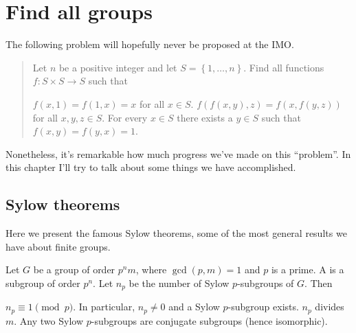 \chapter{Find all groups}
\label{ch:sylow}
The following problem will hopefully never be proposed at the IMO.
\begin{quote}
	Let $n$ be a positive integer and let $S = \left\{ 1,\dots,n \right\}$.
	Find all functions $f \colon S \times S \to S$ such that
	\begin{enumerate}[(a)]
		\ii $f(x,1)=f(1,x)=x$ for all $x \in S$.
		\ii $f(f(x,y),z)=f(x,f(y,z))$ for all $x,y,z \in S$.
		\ii For every $x \in S$ there exists a $y \in S$ such that $f(x,y)=f(y,x)=1$.
	\end{enumerate}
\end{quote}
Nonetheless, it's remarkable how much progress we've made on this ``problem''.
In this chapter I'll try to talk about some things we have accomplished.

\section{Sylow theorems}
Here we present the famous Sylow theorems, some of the most
general results we have about finite groups.

\begin{theorem}
	Let $G$ be a group of order $p^n m$,
	where $\gcd(p,m)=1$ and $p$ is a prime.
	A  is a subgroup of order $p^n$.
	Let $n_p$ be the number of Sylow $p$-subgroups of $G$.
	Then
	\begin{enumerate}[(a)]
		\ii $n_p \equiv 1 \pmod p$. In particular, $n_p \neq 0$ and
		a Sylow $p$-subgroup exists.
		\ii $n_p$ divides $m$.
		\ii Any two Sylow $p$-subgroups are conjugate subgroups (hence isomorphic).
	\end{enumerate}
\end{theorem}


